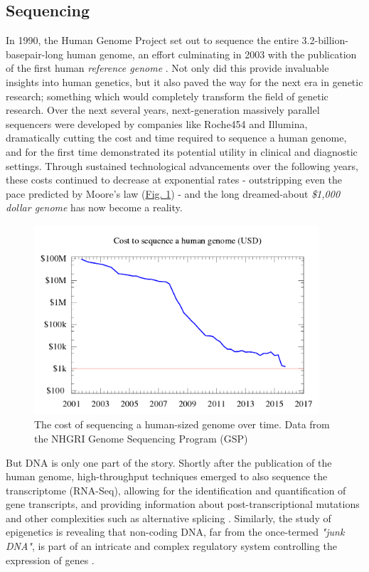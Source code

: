 \subsection{Sequencing}
In 1990, the Human Genome Project \cite{olson1993human} set out to sequence the entire 3.2-billion-basepair-long human genome, an effort culminating in 2003 with the publication of the first human \textit{reference genome} \cite{international2004finishing}. Not only did this provide invaluable insights into human genetics, but it also paved the way for the next era in genetic research; something which would completely transform the field of genetic research. Over the next several years, next-generation massively parallel sequencers were developed by companies like Roche454 and Illumina, dramatically cutting the cost and time required to sequence a human genome, and for the first time demonstrated its potential utility in clinical and diagnostic settings. Through sustained technological advancements over the following years, these costs continued to decrease at exponential rates - outstripping even the pace predicted by Moore's law (\hyperref[fig:seqcost]{Fig. \ref{fig:seqcost}}) - and the long dreamed-about \textit{\$1,000 dollar genome} \cite{thousanddollargenome} \cite{sequencingcostsNHGRI} has now become a reality.

\begin{figure}[h!]
    \centering
    \includegraphics[width=300pt]{chapters/images/Historic_cost_of_sequencing_a_human_genome.png}
    \caption{The cost of sequencing a human-sized genome over time. Data from the NHGRI Genome Sequencing Program (GSP) }
    \label{fig:seqcost}
\end{figure}

But DNA is only one part of the story. Shortly after the publication of the human genome, high-throughput techniques emerged to also sequence the transcriptome (RNA-Seq), allowing for the identification and quantification of gene transcripts, and providing information about post-transcriptional mutations and other complexities such as alternative splicing \cite{wang2009rna}. Similarly, the study of epigenetics is revealing that non-coding DNA, far from the once-termed \textit{"junk DNA"}, is part of an intricate and complex regulatory system controlling the expression of genes \cite{zuckerkandl2007combinatorial}.

